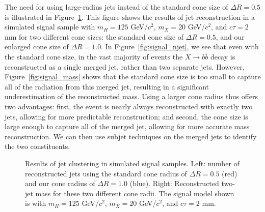 \documentclass{JHEP3}
\begin{document}
The need for using large-radius jets instead of the standard cone size of $\Delta R = 0.5$ is illustrated in
Figure~\ref{fig:signal_jets}. This figure shows the results of jet reconstruction in a simulated signal sample
with $m_H=125$ GeV/$c^2$, $m_X=20$ GeV/$c^2$, and $c\tau=2$ mm for two different cone sizes: the standard cone
size of $\Delta R = 0.5$, and our enlarged cone size of $\Delta R = 1.0$. In Figure~\ref{fig:signal_njet}, we
see that even with the standard cone size, in the vast majority of events the $X \rightarrow b\bar{b}$ decay
is reconstructed as a single merged jet, rather than two separate jets. However, Figure~\ref{fig:signal_mass}
shows that the standard cone size is too small to capture all of the radiation from this merged jet, resulting
in a significant underestimation of the reconstructed mass. Using a larger cone radius thus offers two
advantages: first, the event is nearly always reconstructed with exactly two jets, allowing for more
predictable reconstruction; and second, the cone size is large enough to capture all of the merged jet,
allowing for more accurate mass reconstruction. We can then use subjet techniques on the merged jets to
identify the two constituents.

\begin{figure}[ht]
\begin{center}
  \caption{Results of jet clustering in simulated signal samples. Left: number of reconstructed jets using the
    standard cone radius of $\Delta R = 0.5$ (red) and our cone radius of $\Delta R = 1.0$ (blue). Right:
    Reconstructed two-jet mass for these two different cone radii. The signal model shown is with $m_H=125$
    GeV/$c^2$, $m_X=20$ GeV/$c^2$, and $c\tau=2$ mm.}
  \label{fig:signal_jets}
\end{center}
\end{figure}
\end{document}
